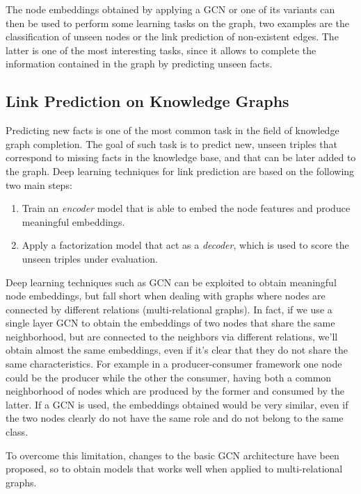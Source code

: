 \documentclass[%
    corpo=13.5pt,
    twoside,
    oldstyle,
    tipotesi=magistrale,
    greek,
    evenboxes
]{toptesi}
\begin{document}
The node embeddings obtained by applying a GCN or one of its variants can
then be used to perform some learning tasks on the graph, two examples are
the classification of unseen nodes or the link prediction of non-existent
edges. The latter is one of the most interesting tasks, since it allows to
complete the information contained in the graph by predicting unseen facts.

\subsection{Link Prediction on Knowledge Graphs}
\label{subsec:linkprediction}

Predicting new facts is one of the most common task in the field
of knowledge graph completion. The goal of such task is to predict new, unseen
triples that correspond to missing facts in the knowledge base, and that can be
later added to the graph.
Deep learning techniques for link prediction are based on the following two
main steps:

\begin{enumerate}
    \item Train an \emph{encoder} model
    that is able to embed the node features and produce meaningful embeddings.
    \item Apply a factorization model that act as a \emph{decoder}, which is
    used to score the unseen triples under evaluation.
\end{enumerate}

Deep learning techniques such as GCN can be exploited to obtain meaningful
node embeddings, but fall short when dealing with graphs where
nodes are connected by different relations (multi-relational graphs).
In fact, if we use a single layer GCN to obtain the embeddings of two nodes
that share the same neighborhood, but are connected to the neighbors via
different relations, we'll obtain almost the same embeddings, even if it's
clear that they do not share the same characteristics. For example in a
producer-consumer framework one node could be the producer while the other
the consumer, having both a common neighborhood of nodes
which are produced by the former and consumed by the latter.
If a GCN is used, the embeddings obtained would be very similar, even if
the two nodes clearly do not have the same role and do not belong to the
same class.

To overcome this limitation, changes to the basic GCN architecture have been
proposed, so to obtain models that works well when applied to multi-relational
graphs.
\newline
\end{document}
